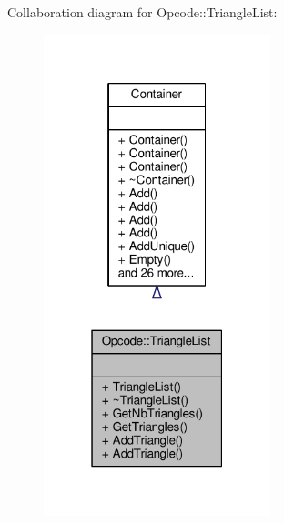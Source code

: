 Collaboration diagram for Opcode\+:\+:Triangle\+List\+:
\nopagebreak
\begin{figure}[H]
\begin{center}
\leavevmode
\includegraphics[width=187pt]{d2/dd8/classOpcode_1_1TriangleList__coll__graph}
\end{center}
\end{figure}
